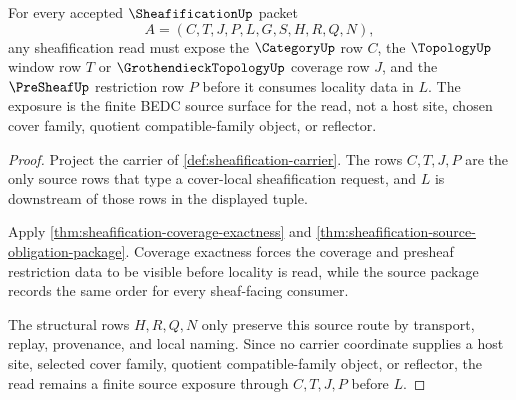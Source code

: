 \begin{theorem}
\label{thm:sheafification-source-exposure-obligation}
For every accepted $\SheafificationUp$ packet
$$
A=(C,T,J,P,L,G,S,H,R,Q,N),
$$
any sheafification read must expose the $\CategoryUp$ row $C$, the $\TopologyUp$ window row $T$ or $\GrothendieckTopologyUp$ coverage row $J$, and the $\PreSheafUp$ restriction row $P$ before it consumes locality data in $L$. The exposure is the finite BEDC source surface for the read, not a host site, chosen cover family, quotient compatible-family object, or reflector.
\end{theorem}
\begin{proof}
Project the carrier of \autoref{def:sheafification-carrier}. The rows $C,T,J,P$ are the only source rows that type a cover-local sheafification request, and $L$ is downstream of those rows in the displayed tuple.

Apply \autoref{thm:sheafification-coverage-exactness} and \autoref{thm:sheafification-source-obligation-package}. Coverage exactness forces the coverage and presheaf restriction data to be visible before locality is read, while the source package records the same order for every sheaf-facing consumer.

The structural rows $H,R,Q,N$ only preserve this source route by transport, replay, provenance, and local naming. Since no carrier coordinate supplies a host site, selected cover family, quotient compatible-family object, or reflector, the read remains a finite source exposure through $C,T,J,P$ before $L$.
\end{proof}

